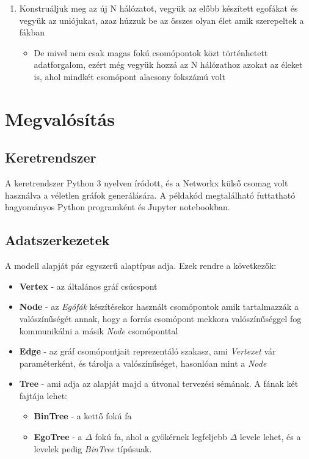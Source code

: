 \documentclass[12pt]{report}
\begin{document}
\begin{enumerate}
\begin{itemize}
	\end{itemize}
	\item Konstruáljuk meg az új N hálózatot, vegyük az előbb készített egofákat és vegyük az uniójukat, azaz húzzuk be az összes olyan élet amik szerepeltek a fákban
	\begin{itemize}
		\item     De mivel nem csak magas fokú csomópontok közt történhetett adatforgalom, ezért még vegyük hozzá az N hálózathoz azokat az éleket is, ahol mindkét csomópont alacsony fokszámú volt
	\end{itemize}
\end{enumerate}

\chapter{Megvalósítás}

\section{Keretrendszer}

A keretrendszer Python 3 nyelven íródott, és a Networkx külső csomag volt használva a véletlen gráfok generálására.
A példakód megtalálható futtatható hagyományos Python programként és Jupyter notebookban.  

\section{Adatszerkezetek}

A modell alapját pár egyszerű alaptípus adja. Ezek rendre a következők:
\begin{itemize}
	\item \textbf{Vertex} - az általános gráf csúcspont
	\item \textbf{Node} - az \textit{Egófák} készítésekor használt csomópontok amik tartalmazzák a valószínűségét annak, hogy a forrás csomópont mekkora valószínűséggel fog kommunikálni a másik \textit{Node} csomóponttal
	\item \textbf{Edge} - az gráf csomópontjait reprezentáló szakasz, ami \textit{Vertexet} vár paraméterként, és tárolja a valószínűséget, hasonlóan mint a \textit{Node}
	\item \textbf{Tree} - ami adja az alapját majd a útvonal tervezési sémának. A fának két fajtája lehet:
	\begin{itemize}
		\item \textbf{BinTree} - a kettő fokú fa
		\item \textbf{EgoTree} - a $\Delta$ fokú fa, ahol a gyökérnek legfeljebb $\Delta$ levele lehet, és a levelek pedig \textit{BinTree} típúsuak.
	\end{itemize}
	
\end{itemize}
	
\end{document}
